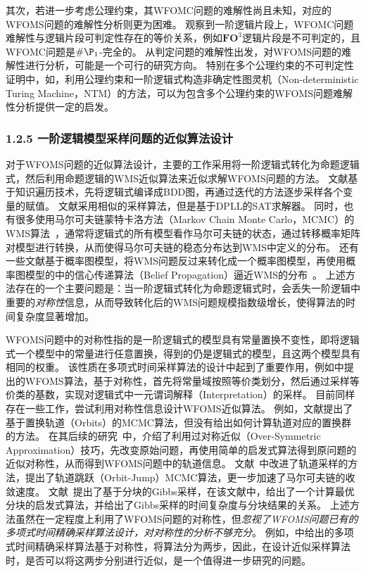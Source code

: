 \documentclass[12pt,UTF8,AutoFakeBold=3,a4paper]{ctexart} %
\newcommand{\fothree}{\ensuremath{\mathbf{FO}^3}}
\begin{document}
其次，若进一步考虑公理约束，其WFOMC问题的难解性尚且未知，对应的WFOMS问题的难解性分析则更为困难。
观察到一阶逻辑片段上，WFOMC问题难解性与逻辑片段可判定性存在的等价关系，例如\fothree{}逻辑片段是不可判定的，且WFOMC问题是$\#\P_1$-完全的。
从判定问题的难解性出发，对WFOMS问题的难解性进行分析，可能是一个可行的研究方向。
特别在多个公理约束的不可判定性证明中，如，利用公理约束和一阶逻辑式构造非确定性图灵机（Non-deterministic Turing Machine，NTM）的方法，可以为包含多个公理约束的WFOMS问题难解性分析提供一定的启发。

\subsubsection{1.2.5 一阶逻辑模型采样问题的近似算法设计}

对于WFOMS问题的近似算法设计，主要的工作采用将一阶逻辑式转化为命题逻辑式，然后利用命题逻辑的WMS近似算法来近似求解WFOMS问题的方法。
文献\cite{kukula2000building}基于知识遍历技术，先将逻辑式编译成BDD图，再通过迭代的方法逐步采样各个变量的赋值。
文献\cite{moskewicz2001chaff}采用相似的采样算法，但是基于DPLL的SAT求解器。
同时，也有很多使用马尔可夫链蒙特卡洛方法（Markov Chain Monte Carlo，MCMC）的WMS算法~，通常将逻辑式的所有模型看作马尔可夫链的状态，通过转移概率矩阵对模型进行转换，从而使得马尔可夫链的稳态分布达到WMS中定义的分布。
还有一些文献基于概率图模型，将WMS问题反过来转化成一个概率图模型，再使用概率图模型的中的信心传递算法（Belief Propagation）逼近WMS的分布~。
上述方法存在的一个主要问题是：当一阶逻辑式转化为命题逻辑式时，会丢失一阶逻辑中重要的\emph{对称性}信息，从而导致转化后的WMS问题规模指数级增长，使得算法的时间复杂度显著增加。

WFOMS问题中的对称性指的是一阶逻辑式的模型具有常量置换不变性，即将逻辑式一个模型中的常量进行任意置换，得到的仍是逻辑式的模型，且这两个模型具有相同的权重。
该性质在多项式时间采样算法的设计中起到了重要作用，例如中提出的WFOMS算法，基于对称性，首先将常量域按照等价类划分，然后通过采样等价类的基数，实现对逻辑式中一元谓词解释（Interpretation）的采样。
目前同样存在一些工作，尝试利用对称性信息设计WFOMS近似算法。
例如，文献\cite{niepert_markov_2012}提出了基于置换轨道（Orbits）的MCMC算法，但没有给出如何计算轨道对应的置换群的方法。
在其后续的研究~中，介绍了利用过对称近似（Over-Symmetric Approximation）技巧，先改变原始问题，再使用简单的启发式算法得到原问题的近似对称性，从而得到WFOMS问题中的轨道信息。
文献~\cite{holtzen2020generating}中改进了轨道采样的方法，提出了轨道跳跃（Orbit-Jump）MCMC算法，更一步加速了马尔可夫链的收敛速度。
文献~\cite{DBLP:conf/nips/VenugopalG12}提出了基于分块的Gibbs采样，在该文献中，给出了一个计算最优分块的启发式算法，并给出了Gibbs采样的时间复杂度与分块结果的关系。
上述方法虽然在一定程度上利用了WFOMS问题的对称性，但\emph{忽视了WFOMS问题已有的多项式时间精确采样算法设计，对对称性的分析不够充分}。
例如，中给出的多项式时间精确采样算法基于对称性，将算法分为两步，因此，在设计近似采样算法时，是否可以将这两步分别进行近似，是一个值得进一步研究的问题。
\end{document}
